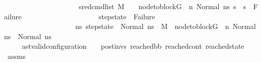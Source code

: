 \begin{isabellebody}
\ \ \ \ \ \ \ \ \ \ \ \ \ \ \ \ \ \ \ \ {\isacharparenleft}{\kern0pt}{\isasymAnd}\ s{}{\isacharprime}{\kern0pt}{\isachardot}{\kern0pt}{\isacharparenleft}{\kern0pt}{\isacharparenleft}{\kern0pt}red{\isacharunderscore}{\kern0pt}cmd{\isacharunderscore}{\kern0pt}list\ M\ {\isasymLambda}\ {\isasymGamma}\ {\isasymOmega}\ {\isacharparenleft}{\kern0pt}node{\isacharunderscore}{\kern0pt}to{\isacharunderscore}{\kern0pt}block{\isacharparenleft}{\kern0pt}G{\isacharparenright}{\kern0pt}\ {\isacharbang}{\kern0pt}\ n{\isacharparenright}{\kern0pt}\ {\isacharparenleft}{\kern0pt}Normal\ ns{}{\isacharparenright}{\kern0pt}\ s{}{\isacharprime}{\kern0pt}{\isacharparenright}{\kern0pt}\ {\isasymLongrightarrow}\ {\isacharparenleft}{\kern0pt}s{}{\isacharprime}{\kern0pt}\ {\isasymnoteq}\ Failure{\isacharparenright}{\kern0pt}{\isacharparenright}{\kern0pt}{\isacharparenright}{\kern0pt}\ {\isasymLongrightarrow}\isanewline
\ \ \ \ \ \ \ \ \ \ \ \ \ \ \ \ \ \ \ \ step{\isacharunderscore}{\kern0pt}state\ {\isasymnoteq}\ Failure\ \ {\isasymand}\isanewline
\ \ \ \ \ \ \ \ \ \ \ \ \ \ \ \ \ \ \ \ {\isacharparenleft}{\kern0pt}{\isasymforall}ns{}{\isacharprime}{\kern0pt}{\isachardot}{\kern0pt}\ step{\isacharunderscore}{\kern0pt}state\ {\isacharequal}{\kern0pt}\ Normal\ ns{}{\isacharprime}{\kern0pt}\ {\isasymlongrightarrow}\ {\isacharparenleft}{\kern0pt}M{\isacharcomma}{\kern0pt}{\isasymLambda}{\isacharcomma}{\kern0pt}{\isasymGamma}{\isacharcomma}{\kern0pt}{\isasymOmega}\ {\isasymturnstile}\ {\isasymlangle}node{\isacharunderscore}{\kern0pt}to{\isacharunderscore}{\kern0pt}block{\isacharparenleft}{\kern0pt}G{\isacharparenright}{\kern0pt}\ {\isacharbang}{\kern0pt}\ n{\isacharcomma}{\kern0pt}\ Normal\ ns{}{\isasymrangle}\ {\isacharbrackleft}{\kern0pt}{\isasymrightarrow}{\isacharbrackright}{\kern0pt}\ Normal\ ns{}{\isacharprime}{\kern0pt}{\isacharparenright}{\kern0pt}{\isacharparenright}{\kern0pt}{\isachardoublequoteclose}\isanewline
\ \ \ \ \ {\isachardoublequoteopen}{\isacharparenleft}{\kern0pt}ast{\isacharunderscore}{\kern0pt}valid{\isacharunderscore}{\kern0pt}configuration\ {\isasymLambda}\ {\isasymGamma}\ {\isasymOmega}\ post{\isacharunderscore}{\kern0pt}invs\ reached{\isacharunderscore}{\kern0pt}bb\ reached{\isacharunderscore}{\kern0pt}cont\ reached{\isacharunderscore}{\kern0pt}state{\isacharparenright}{\kern0pt}{\isachardoublequoteclose}\isanewline
%
\isadelimproof
\ \ %
\endisadelimproof
%
\isatagproof
{}\isamarkupfalse%
\ assms\isanewline
{}\isamarkupfalse%

\end{isabellebody}
